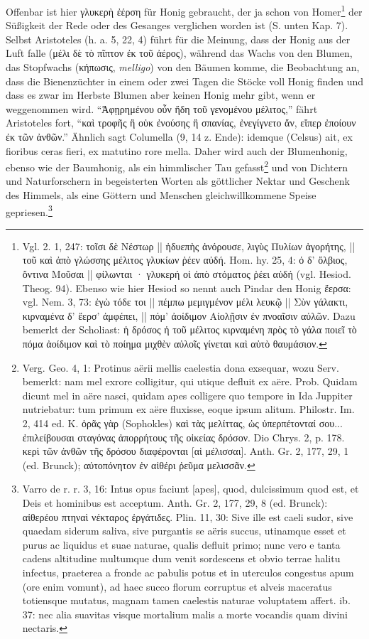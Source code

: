 \documentclass[a4paper, 11pt, oneside]{article}
\begin{document}
Offenbar ist hier γλυκερὴ ἐέρση für Honig gebraucht, der ja schon von Homer\footnote{Vgl. 2. 1, 247: τοῖσι δὲ Νέστωρ || ἡδυεπὴς ἀνόρουσε, λιγὺς Πυλίων ἀγορήτης, || τοῦ καὶ ἀπὸ γλώσσης μέλιτος γλυκίων ῥέεν αὐδή. Hom. hy. 25, 4: ὁ δ' ὄλβιος, ὄντινα Μοῦσαι || φίλωνται · γλυκερή οἱ ἀπὸ στόματος ῥέει αὐδή (vgl. Hesiod. Theog. 94). Ebenso wie hier Hesiod so nennt auch Pindar den Honig ἔερσα: vgl. Nem. 3, 73: ἐγὼ τόδε τοι || πέμπω μεμιγμένον μέλι λευκῷ || Σὺν γάλακτι, κιρναμένα δ' ἔερσ' ἀμφέπει, || πόμ' ἀοίδιμον Αἰολῇσιν ἐν πνοαῖσιν αὐλῶν. Dazu bemerkt der Scholiast: ἡ δρόσος ἡ τοῦ μέλιτος κιρναμένη πρὸς τὸ γάλα ποιεῖ τὸ πόμα ἀοίδιμον καὶ τὸ ποίημα μιχθὲν αὐλοῖς γίνεται καὶ αὐτὸ θαυμάσιον.} der Süßigkeit der Rede oder des Gesanges verglichen worden ist (S. unten Kap. 7). Selbst Aristoteles (h. a. 5, 22, 4) führt für die Meinung, dass der Honig aus der Luft falle (μέλι δὲ τὸ πῖπτον ἐκ τοῦ ἀέρος), während das Wachs von den Blumen, das Stopfwachs (κήπωσις, \emph{melligo}) von den Bäumen komme, die Beobachtung an, dass die Bienenzüchter in einem oder zwei Tagen die Stöcke voll Honig finden und dass es zwar im Herbste Blumen aber keinen Honig mehr gibt, wenn er weggenommen wird. "`Ἀφῃρημένου οὖν ἤδη τοῦ γενομένου μέλιτος,"' fährt Aristoteles fort, "`καὶ τροφῆς ἢ οὐκ ἐνούσης ἢ σπανίας, ἐνεγίγνετο ἄν, εἴπερ ἐποίουν ἐκ τῶν ἀνθῶν."' Ähnlich sagt Columella (9, 14 z. Ende): idemque (Celsus) ait, ex fioribus ceras fieri, ex matutino rore mella. Daher wird auch der Blumenhonig, ebenso wie der Baumhonig, als ein himmlischer Tau gefasst\footnote{Verg. Geo. 4, 1: Protinus aërii mellis caelestia dona exsequar, wozu Serv. bemerkt: nam mel exrore colligitur, qui utique defluit ex aëre. Prob. Quidam dicunt mel in aëre nasci, quidam apes colligere quo tempore in Ida Juppiter nutriebatur: tum primum ex aëre fluxisse, eoque ipsum alitum. Philostr. Im. 2, 414 ed. K. ὁρᾶς γὰρ (Sophokles) καὶ τὰς μελίττας, ὡς ὑπερπέτονταί σου... ἐπιλείβουσαι σταγόνας ἀπορρήτους τῆς οἰκείας δρόσον. Dio Chrys. 2, p. 178. κερὶ τῶν ἀνθῶν τῆς δρόσου διαφέρονται [αἱ μέλισσαι]. Anth. Gr. 2, 177, 29, 1 (ed. Brunck); αὐτοπόνητον ἐν αἰθέρι ῥεῦμα μελισσᾶν.} und von Dichtern und Naturforschern in begeisterten Worten als göttlicher Nektar und Geschenk des Himmels, als eine Göttern und Menschen gleichwillkommene Speise gepriesen.\footnote{Varro de r. r. 3, 16: Intus opus faciunt [apes], quod, dulcissimum quod est, et Deis et hominibus est acceptum. Anth. Gr. 2, 177, 29, 8 (ed. Brunck): αἰθερέου πτηναὶ νέκταρος ἐργάτιδες. Plin. 11, 30: Sive ille est caeli sudor, sive quaedam siderum saliva, sive purgantis se aëris succus, utinamque esset et purus ac liquidus et suae naturae, qualis defluit primo; nunc vero e tanta cadens altitudine multumque dum venit sordescens et obvio terrae halitu infectus, praeterea a fronde ac pabulis potus et in uterculos congestus apum (ore enim vomunt), ad haec succo florum corruptus et alveis maceratus totiensque mutatus, magnam tamen caelestis naturae voluptatem affert. ib. 37: nec alia suavitas visque mortalium malis a morte vocandis quam divini nectaris.}
\end{document}
